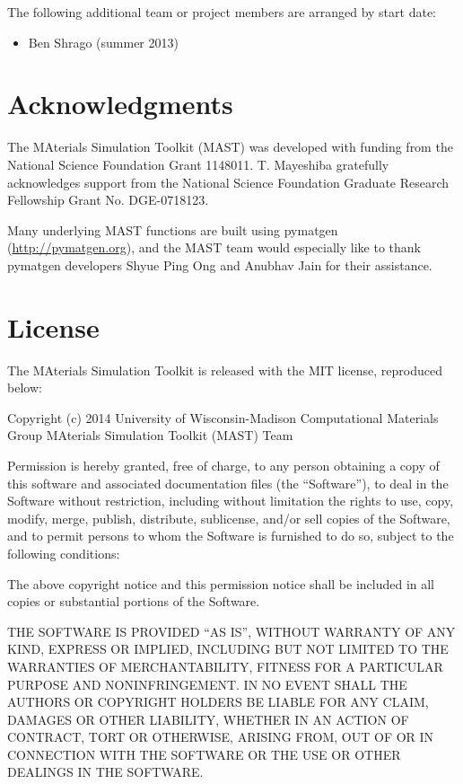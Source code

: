 \documentclass[letterpaper,10pt,english]{sphinxmanual}
\begin{document}
The following additional team or project members are arranged by start date:
\begin{itemize}
\item {} 
Ben Shrago (summer 2013)

\end{itemize}


\chapter{Acknowledgments}
\label{10_0_acknowledgments::doc}\label{10_0_acknowledgments:acknowledgments}

The MAterials Simulation Toolkit (MAST) was developed with funding from the National Science Foundation Grant 1148011. T. Mayeshiba gratefully acknowledges support from the National Science Foundation Graduate Research Fellowship Grant No. DGE-0718123.


Many underlying MAST functions are built using pymatgen (\href{http://pymatgen.org}{http://pymatgen.org}), and the MAST team would especially like to thank pymatgen developers Shyue Ping Ong and Anubhav Jain for their assistance.


\chapter{License}
\label{11_0_license::doc}\label{11_0_license:license}
The MAterials Simulation Toolkit is released with the MIT license, reproduced below:

Copyright (c) 2014 University of Wisconsin-Madison Computational Materials Group MAterials Simulation Toolkit (MAST) Team

Permission is hereby granted, free of charge, to any person obtaining a copy
of this software and associated documentation files (the ``Software''), to deal
in the Software without restriction, including without limitation the rights
to use, copy, modify, merge, publish, distribute, sublicense, and/or sell
copies of the Software, and to permit persons to whom the Software is
furnished to do so, subject to the following conditions:

The above copyright notice and this permission notice shall be included in
all copies or substantial portions of the Software.

THE SOFTWARE IS PROVIDED ``AS IS'', WITHOUT WARRANTY OF ANY KIND, EXPRESS OR
IMPLIED, INCLUDING BUT NOT LIMITED TO THE WARRANTIES OF MERCHANTABILITY,
FITNESS FOR A PARTICULAR PURPOSE AND NONINFRINGEMENT. IN NO EVENT SHALL THE
AUTHORS OR COPYRIGHT HOLDERS BE LIABLE FOR ANY CLAIM, DAMAGES OR OTHER
LIABILITY, WHETHER IN AN ACTION OF CONTRACT, TORT OR OTHERWISE, ARISING FROM,
OUT OF OR IN CONNECTION WITH THE SOFTWARE OR THE USE OR OTHER DEALINGS IN
THE SOFTWARE.



\renewcommand{\indexname}{Index}
\printindex
\end{document}
